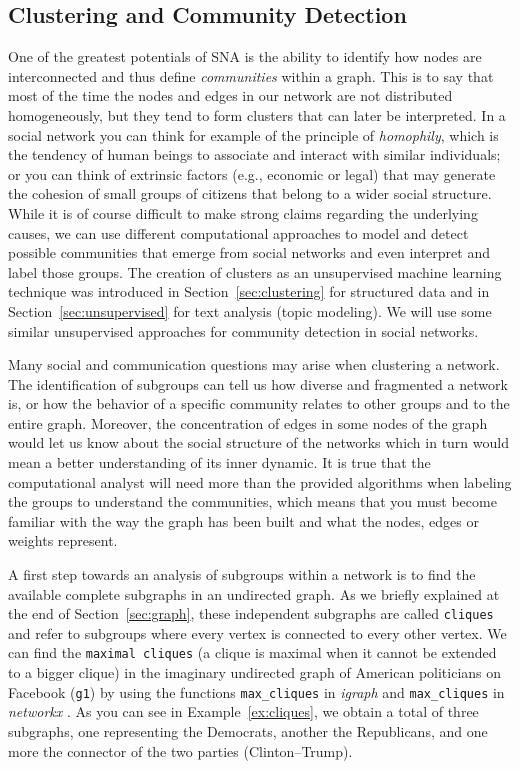 \subsection{Clustering and Community Detection}\label{sec:communitydetection}

One of the greatest potentials of SNA is the ability to identify how nodes are interconnected and thus define \emph{communities} within a graph. This is to say that most of the time the nodes and edges in our network are not distributed homogeneously, but they tend to form clusters that can  later be interpreted. In a social network you can think for example of the principle of \emph{homophily}, which is the tendency of human beings to associate and interact with similar individuals; or you can think of extrinsic factors (e.g., economic or legal) that may generate the cohesion of small groups of citizens that belong to a wider social structure. While it is of course difficult to make strong claims regarding the underlying causes, we can use different computational approaches to model and detect possible communities that emerge from social networks and even interpret and label those groups. The creation of clusters as an unsupervised machine learning technique was introduced in Section~\ref{sec:clustering} for structured data and in Section~\ref{sec:unsupervised} for text analysis (topic modeling). We will use some similar unsupervised approaches for community detection in social networks.

Many social and communication questions may arise when clustering a network. The identification of subgroups can tell us how diverse and fragmented a network is, or how the behavior of a specific community relates to other groups and to the entire graph. Moreover, the concentration of edges in some nodes of the graph would let us know about the social structure of the networks which in turn would mean a better understanding of its inner dynamic.  It is true that the computational analyst will need more than the provided algorithms when labeling the groups to understand the communities, which means that you must become familiar with the way the graph has been built and what the nodes, edges or weights represent.

A first step towards an analysis of subgroups within a network is to find the available complete subgraphs in an undirected graph. As we briefly explained at the end of Section~\ref{sec:graph}, these independent subgraphs are called \texttt{cliques} and refer to subgroups where every vertex is connected to every other vertex. We can find the \texttt{maximal cliques} (a clique is maximal when it cannot be extended to a  bigger clique) in the imaginary undirected graph of American politicians on Facebook (\texttt{g1}) by using the functions \texttt{max\_cliques} in \emph{igraph} \citep{eppstein2010listing} and \texttt{max\_cliques} in \emph{networkx} \citep{cazals2008note}. As you can see in Example~\ref{ex:cliques}, we obtain a total of three subgraphs, one representing the Democrats, another the Republicans, and one more the connector of the two parties (Clinton--Trump).

